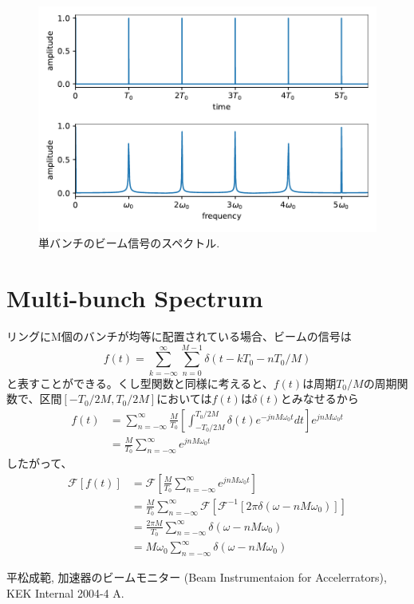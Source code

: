 \documentclass[]{jlreq}
\begin{document}
\begin{figure}[hbt]
  \begin{center}
    \includegraphics[width=12cm,clip]{single_bunch.pdf}
    \caption{単バンチのビーム信号のスペクトル.}
   \label{single_bunch}
  \end{center}
\end{figure}
%
\section{Multi-bunch Spectrum}
リングにM個のバンチが均等に配置されている場合、ビームの信号は
%
\begin{equation}
  f(t) = \sum_{k=-\infty}^{\infty} \sum_{n=0}^{M-1}\delta (t - k T_0 -n T_0 / M)
\end{equation}
%
と表すことができる。くし型関数と同様に考えると、$f(t)$は周期$T_0/M$の周期関数で、区間$[-T_0/2M, T_0/2M]$においては$f(t)$は$\delta(t)$とみなせるから
%
%
\begin{align}
  f(t) &= \sum_{n = -\infty}^{\infty} \frac{M}{T_0} \left[\int_{-T_0/2M}^{T_0/2M}\delta (t) e^{-j n M \omega_0 t} dt\right] 
  e^{j n M \omega_0 t} \\
              &= \frac{M}{T_0} \sum_{n = -\infty}^{\infty} e^{j n M \omega_0 t} 
\end{align}
%
したがって、
%
\begin{align}
  \mathcal{F}[f(t)] &= \mathcal{F}\left[\frac{M}{T_0} \sum_{n = -\infty}^{\infty} e^{j n M \omega_0 t}\right] \\ 
      & = \frac{M}{T_0} \sum_{n = -\infty}^{\infty} \mathcal{F}[\mathcal{F}^{-1}[2\pi \delta(\omega - n M \omega_0)]] \\ 
      & = \frac{2 \pi M}{T_0} \sum_{n = -\infty}^{\infty} \delta(\omega - n M \omega_0)\\ 
      &= M \omega_0 \sum_{n = -\infty}^{\infty} \delta(\omega - n M \omega_0)
\end{align}
%
\begin{thebibliography}{9}
  平松成範, 加速器のビームモニター (Beam Instrumentaion for Accelerrators), KEK Internal 2004-4 A.
\end{thebibliography}
%
\end{document}
